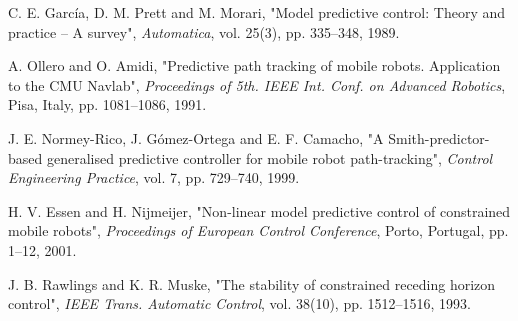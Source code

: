 \documentclass[twocolumn]{IEEEtran} %
\begin{document}
\begin{thebibliography}{}
C. E. Garc\'{i}a, D. M. Prett and M. Morari, 
"Model predictive control: Theory and practice -- A survey",
{\em Automatica\/}, vol. 25(3), pp. 335--348, 1989.

A. Ollero and O. Amidi,
"Predictive path tracking of mobile robots. Application to the CMU Navlab",
{\em Proceedings of 5th. IEEE Int. Conf. on Advanced Robotics\/}, Pisa, Italy, pp. 1081--1086, 1991.

J. E. Normey-Rico, J. G\'{o}mez-Ortega and E. F. Camacho, 
"A Smith-predictor-based generalised predictive controller for mobile robot path-tracking",
{\em Control Engineering Practice\/}, vol. 7, pp. 729--740, 1999.

H. V. Essen and H. Nijmeijer,
"Non-linear model predictive control of constrained mobile robots",
{\em Proceedings of European Control Conference\/}, Porto, Portugal, pp. 1--12, 2001.

J. B. Rawlings and K. R. Muske, 
"The stability of constrained receding horizon control",
{\em IEEE Trans. Automatic Control\/}, vol. 38(10), pp. 1512--1516, 1993.

\end{thebibliography}
\end{document}
